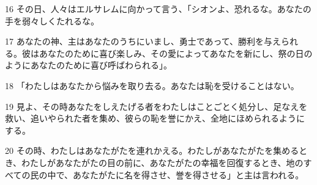 \par 16 その日、人々はエルサレムに向かって言う、「シオンよ、恐れるな。あなたの手を弱々しくたれるな。
\par 17 あなたの神、主はあなたのうちにいまし、勇士であって、勝利を与えられる。彼はあなたのために喜び楽しみ、その愛によってあなたを新にし、祭の日のようにあなたのために喜び呼ばわられる」。
\par 18 「わたしはあなたから悩みを取り去る。あなたは恥を受けることはない。
\par 19 見よ、その時あなたをしえたげる者をわたしはことごとく処分し、足なえを救い、追いやられた者を集め、彼らの恥を誉にかえ、全地にほめられるようにする。
\par 20 その時、わたしはあなたがたを連れかえる。わたしがあなたがたを集めるとき、わたしがあなたがたの目の前に、あなたがたの幸福を回復するとき、地のすべての民の中で、あなたがたに名を得させ、誉を得させる」と主は言われる。


